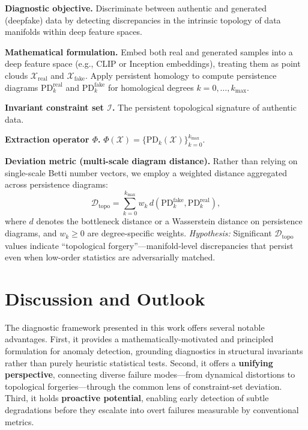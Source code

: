 \documentclass[11pt]{article}
\begin{document}
\textbf{Diagnostic objective.}
Discriminate between authentic and generated (deepfake) data by detecting discrepancies in the intrinsic topology of data manifolds within deep feature spaces.

\textbf{Mathematical formulation.}
Embed both real and generated samples into a deep feature space (e.g., CLIP or Inception embeddings), treating them as point clouds $\mathcal{X}_{\text{real}}$ and $\mathcal{X}_{\text{fake}}$. Apply persistent homology to compute persistence diagrams $\mathrm{PD}_k^{\text{real}}$ and $\mathrm{PD}_k^{\text{fake}}$ for homological degrees $k=0,\dots,k_{\max}$.

\textbf{Invariant constraint set $\mathcal{I}$.}
The persistent topological signature of authentic data.

\textbf{Extraction operator $\Phi$.}
$\Phi(\mathcal{X}) = \{\mathrm{PD}_k(\mathcal{X})\}_{k=0}^{k_{\max}}$.

\textbf{Deviation metric (multi-scale diagram distance).}
Rather than relying on single-scale Betti number vectors, we employ a weighted distance aggregated across persistence diagrams:
\begin{equation}
\mathcal{D}_{\text{topo}}
=
\sum_{k=0}^{k_{\max}} w_k \, d\!\left(\mathrm{PD}_k^{\text{fake}},\mathrm{PD}_k^{\text{real}}\right),
\end{equation}
where $d$ denotes the bottleneck distance or a Wasserstein distance on persistence diagrams, and $w_k\ge 0$ are degree-specific weights. \emph{Hypothesis:} Significant $\mathcal{D}_{\text{topo}}$ values indicate ``topological forgery''---manifold-level discrepancies that persist even when low-order statistics are adversarially matched.

\section{Discussion and Outlook}

The diagnostic framework presented in this work offers several notable advantages. First, it provides a mathematically-motivated and principled formulation for anomaly detection, grounding diagnostics in structural invariants rather than purely heuristic statistical tests. Second, it offers a \textbf{unifying perspective}, connecting diverse failure modes---from dynamical distortions to topological forgeries---through the common lens of constraint-set deviation. Third, it holds \textbf{proactive potential}, enabling early detection of subtle degradations before they escalate into overt failures measurable by conventional metrics.
\end{document}
